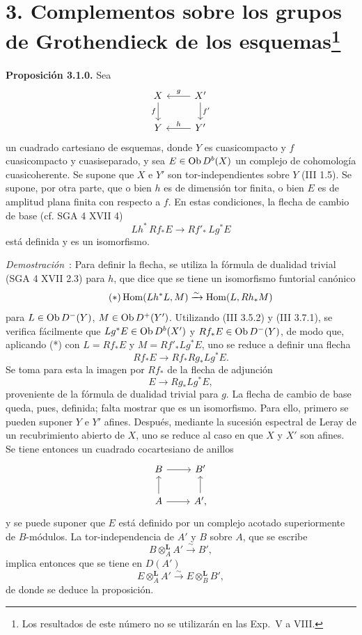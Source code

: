 \providecommand{\sisi}[2]{#2}

\section*{3. Complementos sobre los grupos de Grothendieck de los esquemas\protect\footnote{Los resultados de este número no se utilizarán en las Exp.\ V a VIII.}}

\textbf{Proposición 3.1.0.} Sea
\[
\begin{tikzcd}
X \arrow[d,"f"'] & X' \arrow[l,"g"']\arrow[d,"f'"]\\
Y & Y' \arrow[l,"h"']
\end{tikzcd}
\]
un cuadrado cartesiano de esquemas, donde \(Y\) es cuasicompacto y \(f\) cuasicompacto y cuasiseparado, y sea \(E\in\operatorname{Ob} D^b(X)\) un complejo de cohomología cuasicoherente. Se supone que \(X\) e \(Y'\) son tor-independientes sobre \(Y\) (III 1.5). Se supone, por otra parte, que o bien \(h\) es de dimensión tor finita, o bien \(E\) es de amplitud plana finita con respecto a \(f\). En estas condiciones, la flecha de cambio de base (cf. SGA 4 XVII 4)
\[
 Lh^*\,Rf_*E\longrightarrow Rf'_*\,Lg^*E
\]
está definida y es un isomorfismo.

\emph{Demostración}~: Para definir la flecha, se utiliza la fórmula de dualidad trivial (SGA 4 XVII 2.3) para \(h\), que dice que se tiene un isomorfismo funtorial canónico
\begin{equation}\tag{$*$}
 \operatorname{Hom}(Lh^*L,M)\xrightarrow{\sim}\operatorname{Hom}(L,Rh_*M)
\end{equation}
para \(L\in\operatorname{Ob} D^-(Y)\), \(M\in\operatorname{Ob} D^+(Y')\). Utilizando (III 3.5.2) y (III 3.7.1), se verifica fácilmente que \(Lg^*E\in\operatorname{Ob} D^b(X')\) y \(Rf_*E\in\operatorname{Ob} D^-(Y)\), de modo que, aplicando (*) con \(L=Rf_*E\) y \(M=Rf'_*Lg^*E\), uno se reduce a definir una flecha
\[
 Rf_*E\longrightarrow Rf_*Rg_*Lg^*E.
\]
Se toma para esta la imagen por \(Rf_*\) de la flecha de adjunción
\[
 E\longrightarrow Rg_*Lg^*E,
\]
proveniente de la fórmula de dualidad trivial para \(g\). La flecha de cambio de base queda, pues, definida; falta mostrar que es un isomorfismo. Para ello, primero se pueden suponer \(Y\) e \(Y'\) afines. Después, mediante la sucesión espectral de Leray de un recubrimiento abierto de \(X\), uno se reduce al caso en que \(X\) y \(X'\) son afines. Se tiene entonces un cuadrado cocartesiano de anillos
\[
\begin{tikzcd}
B\arrow[r] & B'\\
A\arrow[u]\arrow[r] & A'\arrow[u],
\end{tikzcd}
\]
y se puede suponer que \(E\) está definido por un complejo acotado superiormente de \(B\)-módulos. La tor-independencia de \(A'\) y \(B\) sobre \(A\), que se escribe
\[
 B\otimes_A^{\mathbf L}A'\xrightarrow{\sim}B',
\]
implica entonces que se tiene en \(D(A')\)
\[
 E\otimes_A^{\mathbf L}A'\xrightarrow{\sim}E\otimes_B^{\mathbf L}B',
\]
de donde se deduce la proposición.

